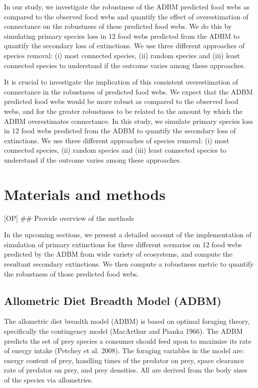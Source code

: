 \documentclass{article}
\begin{document}
In our study, we investigate the robustness of the ADBM predicted food
webs as compared to the observed food webs and quantify the effect of
overestimation of connectance on the robustness of these predicted food
webs. We do this by simulating primary species loss in 12 food webs
predicted from the ADBM to quantify the secondary loss of extinctions.
We use three different approaches of species removal: (i) most connected
species, (ii) random species and (iii) least connected species to
understand if the outcome varies among these approaches.

It is crucial to investigate the implication of this consistent
overestimation of connectance in the robustness of predicted food webs.
We expect that the ADBM predicted food webs would be more robust as
compared to the observed food webs, and for the greater robustness to be
related to the amount by which the ADBM overestimates connectance. In
this study, we simulate primary species loss in 12 food webs predicted
from the ADBM to quantify the secondary loss of extinctions. We use
three different approaches of species removal: (i) most connected
species, (ii) random species and (iii) least connected species to
understand if the outcome varies among these approaches.

\hypertarget{materials-and-methods}{%
\section{Materials and methods}\label{materials-and-methods}}

{[}OP{]} \#\# Provide overview of the methods

In the upcoming sections, we present a detailed account of the
implementation of simulation of primary extinctions for three different
scenarios on 12 food webs predicted by the ADBM from wide variety of
ecosystems, and compute the resultant secondary extinctions. We then
compute a robustness metric to quantify the robustness of those
predicted food webs.

\hypertarget{allometric-diet-breadth-model-adbm}{%
\subsection{Allometric Diet Breadth Model
(ADBM)}\label{allometric-diet-breadth-model-adbm}}

The allometric diet breadth model (ADBM) is based on optimal foraging
theory, specifically the contingency model (MacArthur and Pianka 1966).
The ADBM predicts the set of prey species a consumer should feed upon to
maximise its rate of energy intake (Petchey et al. 2008). The foraging
variables in the model are: energy content of prey, handling times of
the predator on prey, space clearance rate of predator on prey, and prey
densities. All are derived from the body sizes of the species via
allometries.
\end{document}
